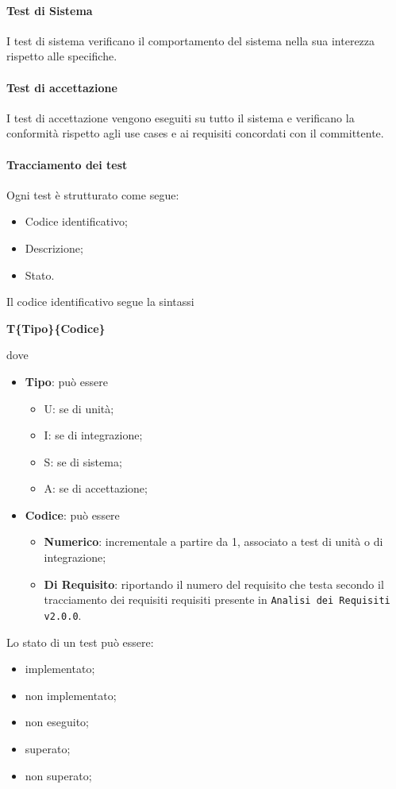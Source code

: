 \paragraph{Test di Sistema}
I test di sistema verificano il comportamento del sistema nella sua interezza rispetto alle specifiche. 
\paragraph{Test di accettazione}
I test di accettazione vengono eseguiti su tutto il sistema e verificano la conformità rispetto agli use cases e ai requisiti concordati con il committente.
\paragraph{Tracciamento dei test}
Ogni test è strutturato come segue:
\begin{itemize}
	\item Codice identificativo;
	\item Descrizione;
	\item Stato.
\end{itemize}
Il codice identificativo segue la sintassi 
\begin{center}
	\textbf{T\{Tipo\}\{Codice\}}
\end{center}
dove 
\begin{itemize}
	\item \textbf{Tipo}: può essere
		\begin{itemize}
			\item U: se di unità;
			\item I: se di integrazione;
			\item S: se di sistema;
			\item A: se di accettazione;
		\end{itemize}
	\item \textbf{Codice}: può essere
		\begin{itemize}
			\item \textbf{Numerico}: incrementale a partire da 1, associato a test di unità o di integrazione;
			\item \textbf{Di Requisito}: riportando il numero del requisito che testa secondo il tracciamento dei requisiti requisiti presente in \texttt{Analisi dei Requisiti v2.0.0}.
		\end{itemize}
\end{itemize}
	Lo stato di un test può essere:
\begin{itemize}
	\item implementato;
	\item non implementato;
	\item non eseguito;
	\item superato;
	\item non superato;
\end{itemize}
